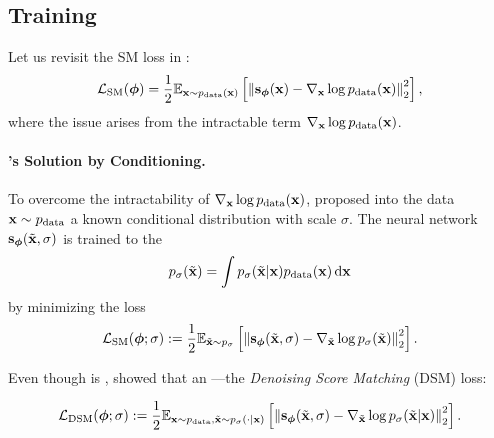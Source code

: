 \subsection{Training}
Let us revisit the SM loss in :
\begin{align*}
     \mathcal{L}_{\text{SM}}(\bm{\phi}) =  \frac{1}{2} \mathbb{E}_{{\mathbf{x}} \sim p_{\text{data}}({\mathbf{x}})} \left[ \left\lVert{\mathbf{s}}_{\bm{\phi}}({\mathbf{x}}) - \nabla_{{\mathbf{x}}} \log p_{\text{data}}({\mathbf{x}})\right\rVert_2^2 \right],
\end{align*}
where the issue arises from the intractable term $\nabla_{{\mathbf{x}}} \log p_{\text{data}}({\mathbf{x}})$.

\paragraph{\citet{vincent2011connection}'s Solution by Conditioning.}
To overcome the intractability of $\nabla_{{\mathbf{x}}} \log p_{\text{data}}({\mathbf{x}})$, \citet{vincent2011connection} proposed  into the data ${\mathbf{x}} \sim p_{\text{data}}$  a known conditional distribution  with scale $\sigma$. The neural network ${\mathbf{s}}_{\bm{\phi}}(\tilde{{\mathbf{x}}}, \sigma)$ is trained to  the 
\[
p_\sigma(\tilde{{\mathbf{x}}}) = \int p_{\sigma}(\tilde{{\mathbf{x}}}|{\mathbf{x}}) p_{\text{data}}({\mathbf{x}}) \mathop{}\!\mathrm{d} {\mathbf{x}}
\]
by minimizing the loss
\begin{align}\label{eq:sm-noise-loss}
\mathcal{L}_{\text{SM}}(\bm{\phi}; \sigma) := \frac{1}{2} \mathbb{E}_{\tilde{{\mathbf{x}}} \sim p_\sigma} \left[ \left\lVert{\mathbf{s}}_{\bm{\phi}}(\tilde{{\mathbf{x}}}, \sigma) - \nabla_{\tilde{{\mathbf{x}}}} \log p_\sigma(\tilde{{\mathbf{x}}})\right\rVert_2^2 \right].
\end{align}

Even though  is , \citet{vincent2011connection} showed that   an —the \emph{Denoising Score Matching} (DSM) loss:
\begin{mdframed}
\begin{align}\label{eq:dsm-loss}
\mathcal{L}_{\text{DSM}}(\bm{\phi}; \sigma) := \frac{1}{2} \mathbb{E}_{{\mathbf{x}} \sim p_{\text{data}}, \tilde{{\mathbf{x}}} \sim p_{\sigma}(\cdot|{\mathbf{x}})} \left[ \left\lVert{\mathbf{s}}_{\bm{\phi}}(\tilde{{\mathbf{x}}}, \sigma) - \nabla_{\tilde{{\mathbf{x}}}} \log p_{\sigma}(\tilde{{\mathbf{x}}}|{\mathbf{x}})\right\rVert_2^2 \right].
\end{align}
\end{mdframed}

